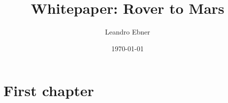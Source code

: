 \documentclass[type=bachelor,twoside,BCOR=1cm]{rwuthesis}
\title{Whitepaper: Rover to Mars}
\author{Leandro Ebner}
\date{\today}
\begin{document}
\maketitle
\tableofcontents

\chapter{First chapter}

\lipsum
\end{document}
